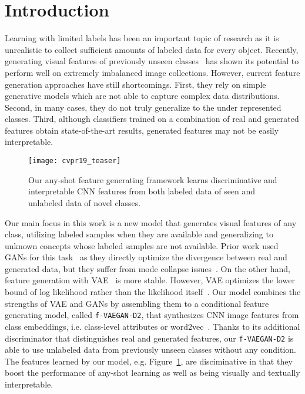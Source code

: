 \documentclass[10pt,twocolumn,letterpaper]{article}
\begin{document}
\section{Introduction}
Learning with limited labels has been an important topic of research as it is unrealistic to collect sufficient amounts of labeled data for every object. Recently, generating visual features of previously unseen classes~\cite{XLSA18,BHJ17,Verma_2018_CVPR,FKRC18} has shown its potential to perform well on extremely imbalanced image collections. However, current feature generation approaches have still shortcomings. First, they rely on simple generative models which are not able to capture complex data distributions. Second, in many cases, they do not truly generalize to the under represented classes. Third, although classifiers trained on a combination of real and generated features obtain state-of-the-art results, generated features may not be easily interpretable.


\begin{figure}[t]
	\centering
        \texttt{[image: cvpr19\_teaser]}
        \vspace{-5mm}
	\caption{Our any-shot feature generating framework learns discriminative and interpretable CNN features from both labeled data of seen and unlabeled data of novel classes. }
	 \vspace{-3mm}
	\label{fig:teaser}
\end{figure}
 
Our main focus in this work is a new model that generates visual features of any class, utilizing labeled samples when they are available and generalizing to unknown concepts whose labeled samples are not available. Prior work used GANs for this task~\cite{XLSA18,FKRC18} as they directly optimize the divergence between real and generated data, but they suffer from mode collapse issues~\cite{arjovsky2017towards}. On the other hand, feature generation with VAE~\cite{Verma_2018_CVPR} is more stable. However, VAE optimizes the lower bound of log likelihood rather than the likelihood itself~\cite{kingma2013auto}. Our model combines the strengths of VAE and GANs by assembling them to a conditional feature generating model, called \texttt{f-VAEGAN-D2}, that synthesizes CNN image features from class embeddings, i.e. class-level attributes or word2vec~\cite{MSCCD13}. Thanks to its additional discriminator that distinguishes real and generated features, our \texttt{f-VAEGAN-D2} is able to use unlabeled data from previously unseen classes without any condition. 
The features learned by our model, e.g. Figure~\ref{fig:teaser}, are disciminative in that they boost the performance of any-shot learning as well as being visually and textually interpretable.
\end{document}
